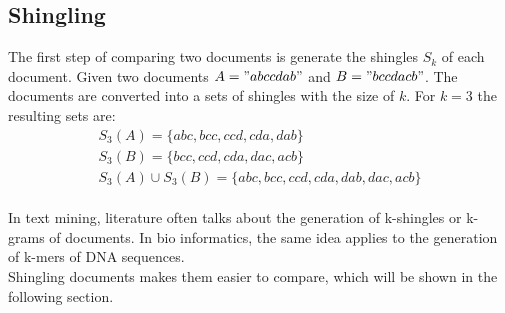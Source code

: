 \subsection{Shingling}

The first step of comparing two documents is generate the shingles $ S_k $ of each document. Given two documents $ A = "abccdab" $ and $ B = "bccdacb" $. The documents are  converted into a sets of shingles with the size of $ k $. For $ k = 3 $ the resulting sets are: \\

\begin{equation}
    \begin{split}
        S_3(A) = \{abc, bcc, ccd, cda, dab\} \\
        S_3(B) = \{bcc, ccd, cda, dac, acb\} \\
        S_3(A) \cup S_3(B) = \{abc, bcc, ccd, cda, dab, dac, acb\}
    \end{split}
\end{equation}\\

In text mining, literature often talks about the generation of k-shingles or k-grams of documents. In bio informatics, the same idea applies to the generation of k-mers of DNA sequences.\\

Shingling documents makes them easier to compare, which will be shown in the following section.\\